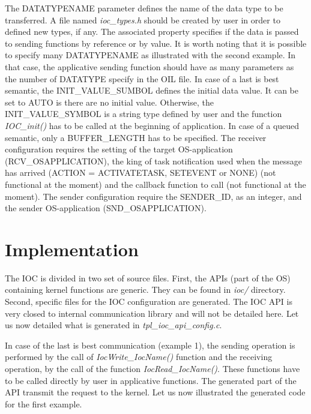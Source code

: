 The DATATYPENAME parameter defines the name of the data type to be transferred. A file named \textit{ioc_types.h} should be created by user in order to defined new types, if any. The associated property specifies if the data is passed to sending functions by reference or by value. It is worth noting that it is possible to specify many DATATYPENAME as illustrated with the second example. In that case, the applicative sending function should have as many parameters as the number of DATATYPE specify in the OIL file. 
In case of a last is best semantic, the INIT_VALUE_SUMBOL defines the initial data value. It can be set to AUTO is there are no initial value. Otherwise, the INIT_VALUE_SYMBOL is a string type defined by user and the function \textit{IOC_init()} has to be called at the beginning of application. In case of a queued semantic, only a BUFFER_LENGTH has to be specified.
The receiver configuration requires the setting of the target OS-application (RCV_OSAPPLICATION), the king of task notification used when the message has arrived (ACTION = ACTIVATETASK, SETEVENT or NONE) (not functional at the moment) and the callback function to call (not functional at the moment).
The sender configuration require the SENDER_ID, as an integer, and the sender OS-application (SND_OSAPPLICATION). 

\section{Implementation}

The IOC is divided in two set of source files. First, the APIs (part of the OS) containing kernel functions are generic. They can be found in \textit{ioc/} directory. Second, specific files for the IOC configuration are generated. The IOC API is very closed to internal communication library and will not be detailed here. Let us now detailed what is generated in \textit{tpl_ioc_api_config.c}.

In case of the last is best communication (example 1), the sending operation is performed by the call of \textit{IocWrite_IocName()} function and the receiving operation, by the call of the function \textit{IocRead_IocName()}. These functions have to be called directly by user in applicative functions. The generated part of the API transmit the request to the kernel. Let us now illustrated the generated code for the first example.


